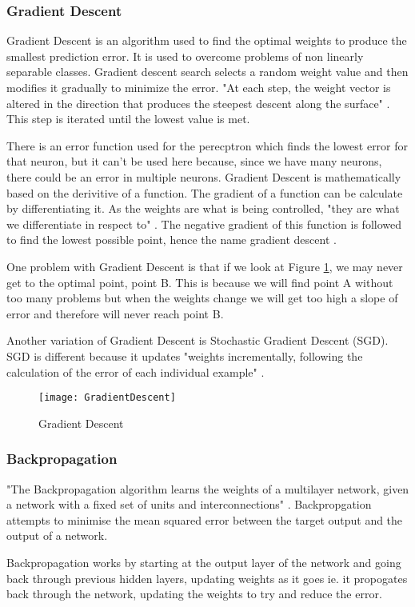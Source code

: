\subsubsection*{Gradient Descent}
Gradient Descent is an algorithm used to find the optimal weights to produce the
smallest prediction error. It is used to overcome problems of non linearly
separable classes. Gradient descent search selects a random weight value and
then modifies it gradually to minimize the error. "At each step, the weight
vector is altered in the direction that produces the steepest descent along the
surface" \textcite{MLANN}. This step is iterated until the lowest value is met.

There is an error function used for the perecptron which finds the lowest error for that neuron, but it can't be used here because, since we have many neurons, there could be an error in multiple neurons.
Gradient Descent is mathematically based on the derivitive of a function.
The gradient of a function can be calculate by differentiating it.
As the weights are what is being controlled, "they are what we differentiate in respect to" \textcite{MLAlgorithm}.
The negative gradient of this function is followed to find the lowest possible point, hence the name gradient descent \textcite{MLAlgorithm}.

One problem with Gradient Descent is that if we look at Figure \ref{fig:GD}, we may
never get to the optimal point, point B. This is because we will find point A
without too many problems but when the weights change we will get too high a
slope of error and therefore will never reach point B.

Another variation of Gradient Descent is Stochastic Gradient Descent (SGD). SGD
is different because it updates "weights incrementally, following the
calculation of the error of each individual example" \textcite{MLANN}. 

\begin{figure}
      \texttt{[image: GradientDescent]}
      \caption{Gradient Descent}
      \label{fig:GD}
 \end{figure}

\subsubsection*{Backpropagation}
"The Backpropagation algorithm learns the weights of a multilayer network,
given a network with a fixed set of units and interconnections" \textcite{MLANN}.
Backpropgation attempts to minimise the mean squared error between the target
output and the output of a network.

Backpropagation works by starting at the output layer of the network and going
back through previous hidden layers, updating weights as it goes ie. it propogates back through the network, updating the weights to try and reduce the error.
